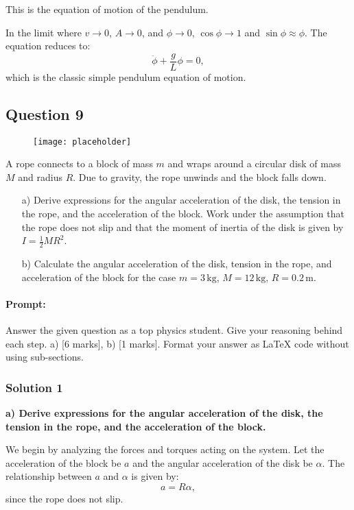 \documentclass{article}
\begin{document}
This is the equation of motion of the pendulum.

In the limit where $v \to 0$, $A \to 0$, and $\phi \to 0$, $\cos\phi \to 1$ and $\sin\phi \approx \phi$. The equation reduces to:
\[
\ddot{\phi} + \frac{g}{L}\phi = 0,
\]
which is the classic simple pendulum equation of motion.

\subsection{Question 9}

\begin{figure}[h!]
    \centering
    \texttt{[image: placeholder]}
    \caption*{}
\end{figure}

A rope connects to a block of mass $m$ and wraps around a circular disk of mass $M$ and radius $R$. Due to gravity, the rope unwinds and the block falls down.

\begin{itemize}
    \item[a)] Derive expressions for the angular acceleration of the disk, the tension in the rope, and the acceleration of the block. Work under the assumption that the rope does not slip and that the moment of inertia of the disk is given by $I = \frac{1}{2} M R^2$.
    
    \item[b)] Calculate the angular acceleration of the disk, tension in the rope, and acceleration of the block for the case $m = 3\, \text{kg}$, $M = 12\, \text{kg}$, $R = 0.2\, \text{m}$.
\end{itemize}


\paragraph{Prompt: \\} 
Answer the given question as a top physics student. Give your reasoning behind each step. a) [6 marks], b) [1 marks].
Format your answer as LaTeX code without using sub-sections.


\subsubsection{Solution 1}
\textbf{a) Derive expressions for the angular acceleration of the disk, the tension in the rope, and the acceleration of the block.}

We begin by analyzing the forces and torques acting on the system. Let the acceleration of the block be $a$ and the angular acceleration of the disk be $\alpha$. The relationship between $a$ and $\alpha$ is given by:
\[
a = R\alpha,
\]
since the rope does not slip.
\end{document}
